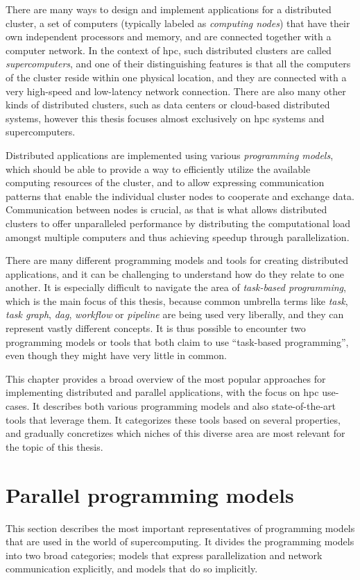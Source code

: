There are many ways to design and implement applications for a distributed cluster, a set of
computers (typically labeled as \emph{computing nodes}) that have their own independent processors
and memory, and are connected together with a computer network. In the context of
\gls{hpc}, such distributed clusters are called \emph{supercomputers}, and one of
their distinguishing features is that all the computers of the cluster reside within one physical
location, and they are connected with a very high-speed and low-latency network connection. There
are also many other kinds of distributed clusters, such as data centers or cloud-based distributed
systems, however this thesis focuses almost exclusively on \gls{hpc} systems and
supercomputers.

Distributed applications are implemented using various \emph{programming models}, which should be able
to provide a way to efficiently utilize the available computing resources of the cluster, and to
allow expressing communication patterns that enable the individual cluster nodes to cooperate and
exchange data. Communication between nodes is crucial, as that is what allows distributed clusters
to offer unparalleled performance by distributing the computational load amongst multiple computers
and thus achieving speedup through parallelization.

There are many different programming models and tools for creating distributed applications, and it
can be challenging to understand how do they relate to one another. It is especially difficult to
navigate the area of \emph{task-based programming}, which is the main focus of this thesis, because common
umbrella terms like \emph{task}, \emph{task graph}, \emph{\gls{dag}},
\emph{workflow} or \emph{pipeline} are being used very liberally, and they can
represent vastly different concepts. It is thus possible to encounter two programming models or
tools that both claim to use ``task-based programming'', even though they might have very little in
common.

This chapter provides a broad overview of the most popular approaches for implementing distributed
and parallel applications, with the focus on \gls{hpc} use-cases. It describes both
various programming models and also state-of-the-art tools that leverage them. It categorizes these
tools based on several properties, and gradually concretizes which niches of this diverse area are
most relevant for the topic of this thesis.

\section{Parallel programming models}
This section describes the most important representatives of programming models that are used in
the world of supercomputing. It divides the programming models into two broad categories; models
that express parallelization and network communication explicitly, and models that do so
implicitly.

